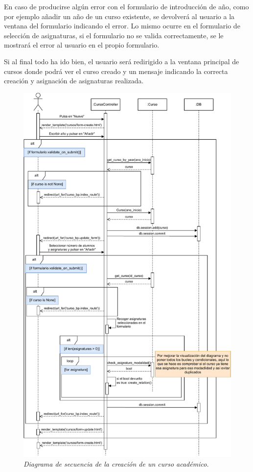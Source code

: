 \begin{itemize}
En caso de producirse algún error con el formulario de introducción de año, como por ejemplo añadir un año de un curso existente, se devolverá al usuario a la ventana del formulario indicando el error. Lo mismo ocurre en el formulario de selección de asignaturas, si el formulario no se valida correctamente, se le mostrará el error al usuario en el propio formulario.

Si al final todo ha ido bien, el usuario será redirigido a la ventana principal de cursos donde podrá ver el curso creado y un mensaje indicando la correcta creación y asignación de asignaturas realizada.


\begin{figure}
	\centering
	\includegraphics[width=.9\textwidth]{../img/Anexos/Diagramas secuencia/DS - crear curso.pdf}
	\caption{\textit{Diagrama de secuencia de la creación de un curso académico.}}\label{DS-crearCurso}
\end{figure}



\end{itemize}
